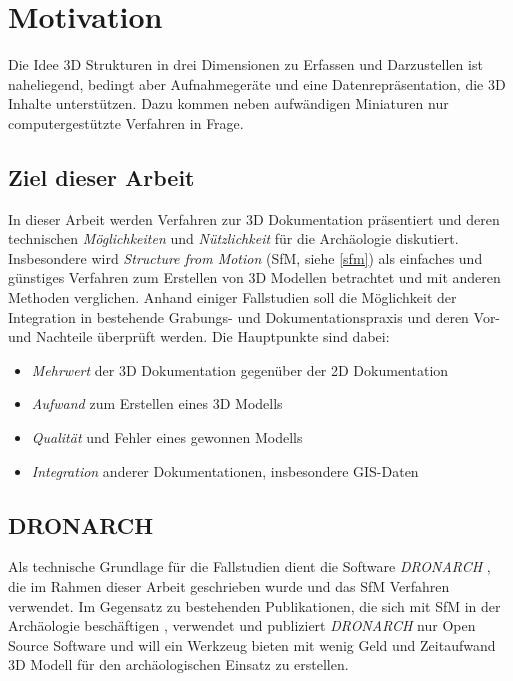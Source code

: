 \chapter{Motivation}
	Die Idee 3D Strukturen in drei Dimensionen zu Erfassen und Darzustellen ist naheliegend, bedingt aber Aufnahmegeräte und eine Datenrepräsentation, die 3D Inhalte unterstützen. Dazu kommen neben aufwändigen Miniaturen nur computergestützte Verfahren in Frage.
	
	\section{Ziel dieser Arbeit}
		In dieser Arbeit werden Verfahren zur 3D Dokumentation präsentiert und deren technischen \emph{Möglichkeiten} und \emph{Nützlichkeit} für die Archäologie diskutiert.
		Insbesondere wird \emph{Structure from Motion} (SfM, siehe \autoref{sfm}) als einfaches und günstiges Verfahren zum Erstellen von 3D Modellen betrachtet und mit anderen Methoden verglichen.
		Anhand einiger Fallstudien soll die Möglichkeit der Integration in bestehende Grabungs- und Dokumentationspraxis und deren Vor- und Nachteile überprüft werden.
		Die Hauptpunkte sind dabei:
		\begin{itemize}
			\item
			\emph{Mehrwert} der 3D Dokumentation gegenüber der 2D Dokumentation
			\item
			\emph{Aufwand} zum Erstellen eines 3D Modells
			\item
			\emph{Qualität} und Fehler eines gewonnen Modells
			\item
			\emph{Integration} anderer Dokumentationen, insbesondere GIS-Daten
		\end{itemize}
		
	\section{DRONARCH}
		Als technische Grundlage für die Fallstudien dient die Software \emph{DRONARCH} \cite{dronarch:github}, die im Rahmen dieser Arbeit geschrieben wurde und das SfM Verfahren verwendet.
		Im Gegensatz zu bestehenden Publikationen, die sich mit SfM in der Archäologie beschäftigen \cite{arch:laser_vs_dense_stereo, ARCM:ARCM667, ARP:ARP399, TUW-210216, DeReu20131108, the_cave, altai}, verwendet und publiziert \emph{DRONARCH} nur Open Source Software und will ein Werkzeug bieten mit wenig Geld und Zeitaufwand 3D Modell für den archäologischen Einsatz zu erstellen.

	